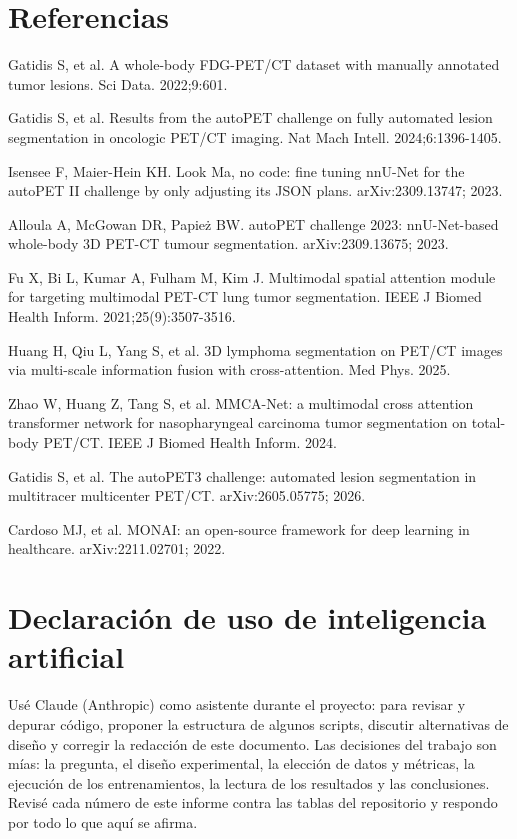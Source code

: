 \documentclass[11pt,a4paper]{article}
\begin{document}
\section*{Referencias}\sloppy
{\small
\begin{enumerate}[label={[\arabic*]},leftmargin=2em]
\item Gatidis S, et al. A whole-body FDG-PET/CT dataset with manually annotated tumor lesions. Sci Data. 2022;9:601.
\item Gatidis S, et al. Results from the autoPET challenge on fully automated lesion segmentation in oncologic PET/CT imaging. Nat Mach Intell. 2024;6:1396-1405.
\item Isensee F, Maier-Hein KH. Look Ma, no code: fine tuning nnU-Net for the autoPET II challenge by only adjusting its JSON plans. arXiv:2309.13747; 2023.
\item Alloula A, McGowan DR, Papież BW. autoPET challenge 2023: nnU-Net-based whole-body 3D PET-CT tumour segmentation. arXiv:2309.13675; 2023.
\item Fu X, Bi L, Kumar A, Fulham M, Kim J. Multimodal spatial attention module for targeting multimodal PET-CT lung tumor segmentation. IEEE J Biomed Health Inform. 2021;25(9):3507-3516.
\item Huang H, Qiu L, Yang S, et al. 3D lymphoma segmentation on PET/CT images via multi-scale information fusion with cross-attention. Med Phys. 2025.
\item Zhao W, Huang Z, Tang S, et al. MMCA-Net: a multimodal cross attention transformer network for nasopharyngeal carcinoma tumor segmentation on total-body PET/CT. IEEE J Biomed Health Inform. 2024.
\item Gatidis S, et al. The autoPET3 challenge: automated lesion segmentation in multitracer multicenter PET/CT. arXiv:2605.05775; 2026.
\item Cardoso MJ, et al. MONAI: an open-source framework for deep learning in healthcare. arXiv:2211.02701; 2022.
\end{enumerate}}

\section*{Declaración de uso de inteligencia artificial}
{\small
Usé Claude (Anthropic) como asistente durante el proyecto: para revisar y depurar código, proponer la estructura de algunos scripts, discutir alternativas de diseño y corregir la redacción de este documento. Las decisiones del trabajo son mías: la pregunta, el diseño experimental, la elección de datos y métricas, la ejecución de los entrenamientos, la lectura de los resultados y las conclusiones. Revisé cada número de este informe contra las tablas del repositorio y respondo por todo lo que aquí se afirma.\par}
\end{document}
